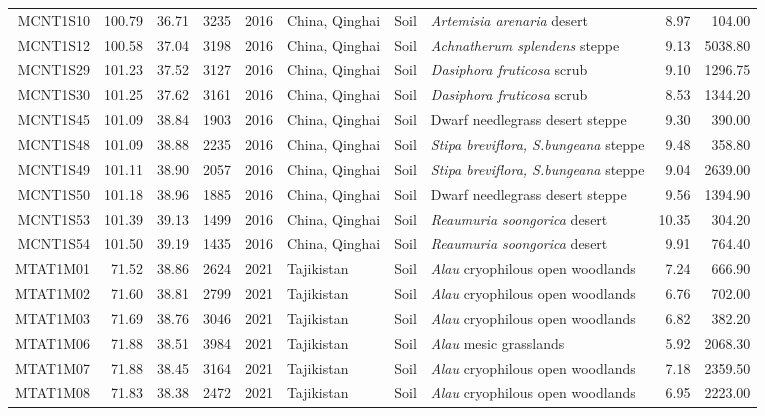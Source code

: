 \begin{table}[ht]
\begin{tabular}{rrrlrlllrr}
  MCNT1S10 & 100.79 & 36.71 & 3235 & 2016 & China, Qinghai & Soil & \textit{Artemisia arenaria} desert & 8.97 & 104.00 \\ 
  MCNT1S12 & 100.58 & 37.04 & 3198 & 2016 & China, Qinghai & Soil & \textit{Achnatherum splendens} steppe & 9.13 & 5038.80 \\ 
  MCNT1S29 & 101.23 & 37.52 & 3127 & 2016 & China, Qinghai & Soil & \textit{Dasiphora fruticosa} scrub & 9.10 & 1296.75 \\ 
  MCNT1S30 & 101.25 & 37.62 & 3161 & 2016 & China, Qinghai & Soil & \textit{Dasiphora fruticosa} scrub & 8.53 & 1344.20 \\ 
  MCNT1S45 & 101.09 & 38.84 & 1903 & 2016 & China, Qinghai & Soil & Dwarf needlegrass desert steppe & 9.30 & 390.00 \\ 
  MCNT1S48 & 101.09 & 38.88 & 2235 & 2016 & China, Qinghai & Soil & \textit{\textit{Stipa breviflora}, S.bungeana} steppe & 9.48 & 358.80 \\ 
  MCNT1S49 & 101.11 & 38.90 & 2057 & 2016 & China, Qinghai & Soil & \textit{\textit{Stipa breviflora}, S.bungeana} steppe & 9.04 & 2639.00 \\ 
  MCNT1S50 & 101.18 & 38.96 & 1885 & 2016 & China, Qinghai & Soil & Dwarf needlegrass desert steppe & 9.56 & 1394.90 \\ 
  MCNT1S53 & 101.39 & 39.13 & 1499 & 2016 & China, Qinghai & Soil & \textit{Reaumuria soongorica} desert & 10.35 & 304.20 \\ 
  MCNT1S54 & 101.50 & 39.19 & 1435 & 2016 & China, Qinghai & Soil & \textit{Reaumuria soongorica} desert & 9.91 & 764.40 \\ 
  MTAT1M01 & 71.52 & 38.86 & 2624 & 2021 & Tajikistan & Soil & \textit{Alau} cryophilous open woodlands & 7.24 & 666.90 \\ 
  MTAT1M02 & 71.60 & 38.81 & 2799 & 2021 & Tajikistan & Soil & \textit{Alau} cryophilous open woodlands & 6.76 & 702.00 \\ 
  MTAT1M03 & 71.69 & 38.76 & 3046 & 2021 & Tajikistan & Soil & \textit{Alau} cryophilous open woodlands & 6.82 & 382.20 \\ 
  MTAT1M06 & 71.88 & 38.51 & 3984 & 2021 & Tajikistan & Soil & \textit{Alau} mesic grasslands & 5.92 & 2068.30 \\ 
  MTAT1M07 & 71.88 & 38.45 & 3164 & 2021 & Tajikistan & Soil & \textit{Alau} cryophilous open woodlands & 7.18 & 2359.50 \\ 
  MTAT1M08 & 71.83 & 38.38 & 2472 & 2021 & Tajikistan & Soil & \textit{Alau} cryophilous open woodlands & 6.95 & 2223.00 \\ 

\end{tabular}
\end{table}

